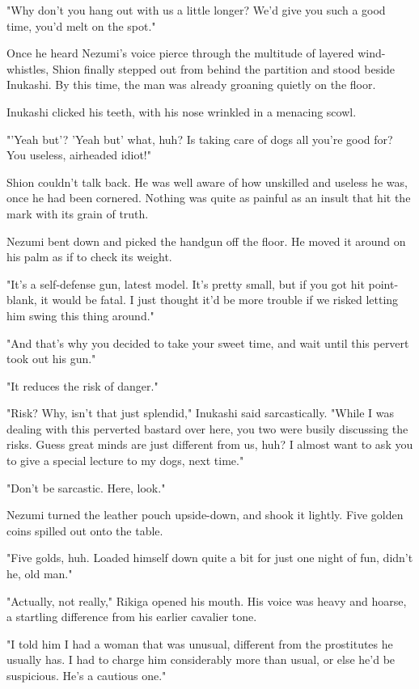 "Why don't you hang out with us a little longer? We'd give you such a
good time, you'd melt on the spot."

Once he heard Nezumi's voice pierce through the multitude of layered
wind-whistles, Shion finally stepped out from behind the partition and
stood beside Inukashi. By this time, the man was already groaning
quietly on the floor.

Inukashi clicked his teeth, with his nose wrinkled in a menacing scowl.

"'Yeah but'? 'Yeah but' what, huh? Is taking care of dogs all you're
good for? You useless, airheaded idiot!"

Shion couldn't talk back. He was well aware of how unskilled and useless
he was, once he had been cornered. Nothing was quite as painful as an
insult that hit the mark with its grain of truth.

Nezumi bent down and picked the handgun off the floor. He moved it
around on his palm as if to check its weight.

"It's a self-defense gun, latest model. It's pretty small, but if you
got hit point-blank, it would be fatal. I just thought it'd be more
trouble if we risked letting him swing this thing around."

"And that's why you decided to take your sweet time, and wait until this
pervert took out his gun."

"It reduces the risk of danger."

"Risk? Why, isn't that just splendid," Inukashi said sarcastically.
"While I was dealing with this perverted bastard over here, you two were
busily discussing the risks. Guess great minds are just different from
us, huh? I almost want to ask you to give a special lecture to my dogs,
next time."

"Don't be sarcastic. Here, look."

Nezumi turned the leather pouch upside-down, and shook it lightly. Five
golden coins spilled out onto the table.

"Five golds, huh. Loaded himself down quite a bit for just one night of
fun, didn't he, old man."

"Actually, not really," Rikiga opened his mouth. His voice was heavy and
hoarse, a startling difference from his earlier cavalier tone.

"I told him I had a woman that was unusual, different from the
prostitutes he usually has. I had to charge him considerably more than
usual, or else he'd be suspicious. He's a cautious one."

